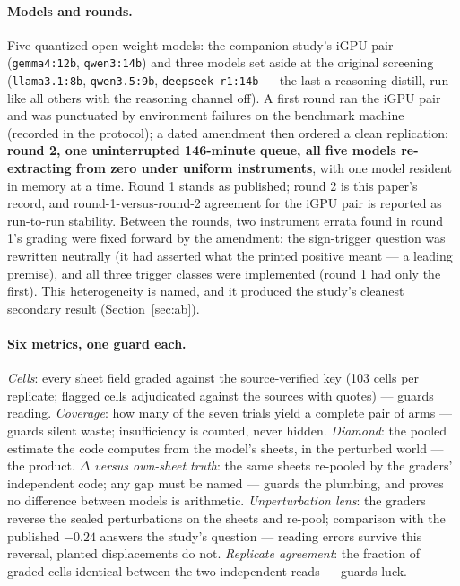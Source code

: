 \documentclass[11pt]{article}
\begin{document}
\paragraph{Models and rounds.} Five quantized open-weight models: the companion study's iGPU pair (\texttt{gemma4:12b}, \texttt{qwen3:14b}) and three models set aside at the original screening (\texttt{llama3.1:8b}, \texttt{qwen3.5:9b}, \texttt{deepseek-r1:14b} --- the last a reasoning distill, run like all others with the reasoning channel off). A first round ran the iGPU pair and was punctuated by environment failures on the benchmark machine (recorded in the protocol); a dated amendment then ordered a clean replication: \textbf{round 2, one uninterrupted 146-minute queue, all five models re-extracting from zero under uniform instruments}, with one model resident in memory at a time. Round 1 stands as published; round 2 is this paper's record, and round-1-versus-round-2 agreement for the iGPU pair is reported as run-to-run stability. Between the rounds, two instrument errata found in round 1's grading were fixed forward by the amendment: the sign-trigger question was rewritten neutrally (it had asserted what the printed positive meant --- a leading premise), and all three trigger classes were implemented (round 1 had only the first). This heterogeneity is named, and it produced the study's cleanest secondary result (Section~\ref{sec:ab}).

\paragraph{Six metrics, one guard each.} \emph{Cells}: every sheet field graded against the source-verified key (103 cells per replicate; flagged cells adjudicated against the sources with quotes) --- guards reading. \emph{Coverage}: how many of the seven trials yield a complete pair of arms --- guards silent waste; insufficiency is counted, never hidden. \emph{Diamond}: the pooled estimate the code computes from the model's sheets, in the perturbed world --- the product. \emph{$\Delta$ versus own-sheet truth}: the same sheets re-pooled by the graders' independent code; any gap must be named --- guards the plumbing, and proves no difference between models is arithmetic. \emph{Unperturbation lens}: the graders reverse the sealed perturbations on the sheets and re-pool; comparison with the published $-0.24$ answers the study's question --- reading errors survive this reversal, planted displacements do not. \emph{Replicate agreement}: the fraction of graded cells identical between the two independent reads --- guards luck.
\end{document}
